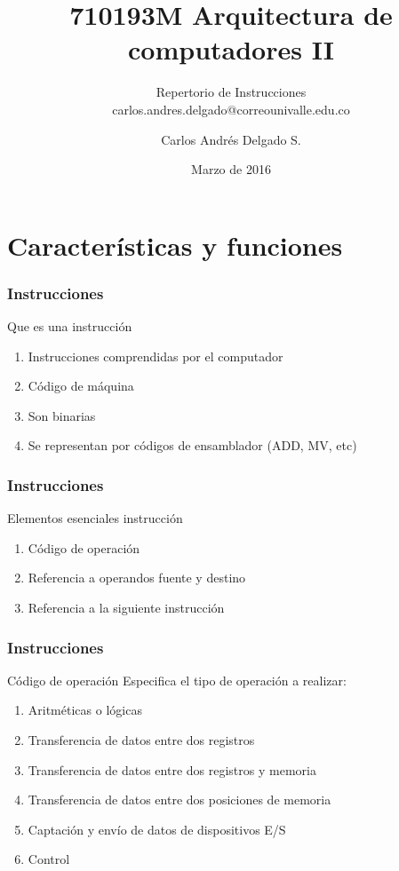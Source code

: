 \documentclass{beamer}
\author{Carlos Andr\'es Delgado S.}
\title{710193M Arquitectura de computadores II}
\subtitle{Repertorio de Instrucciones \\ carlos.andres.delgado@correounivalle.edu.co}
\institute{Facultad de Ingeniería. Universidad del Valle}
\date{Marzo de 2016}
\begin{document}
\begin{frame}
	\titlepage	 		
\end{frame}

\begin{frame}
	\tableofcontents	 		
\end{frame}


\section{Características y funciones}

\begin{frame}
	\frametitle{Instrucciones}
	\begin{block}{Que es una instrucción}
	\begin{enumerate}
		\item Instrucciones comprendidas por el computador
		\item Código de máquina
		\item Son binarias
		\item Se representan por códigos de ensamblador (ADD, MV, etc)
	\end{enumerate}
	
	\end{block}		 		
\end{frame}

\begin{frame}
	\frametitle{Instrucciones}
	\begin{block}{Elementos esenciales instrucción}
	\begin{enumerate}
		\item Código de operación
		\item Referencia a operandos fuente y destino
		\item Referencia a la siguiente instrucción
	\end{enumerate}
	
	\end{block}		 		
\end{frame}

\begin{frame}
	\frametitle{Instrucciones}
	\begin{block}{Código de operación}
	Especifica el tipo de operación a realizar:	
	\begin{enumerate}
		\item Aritméticas o lógicas
		\item Transferencia de datos entre dos registros
		\item Transferencia de datos entre dos registros y memoria
		\item Transferencia de datos entre dos posiciones de memoria
		\item Captación y envío de datos de dispositivos E/S
		\item Control
	\end{enumerate}	
	\end{block}		 		
\end{frame}
\end{document}
